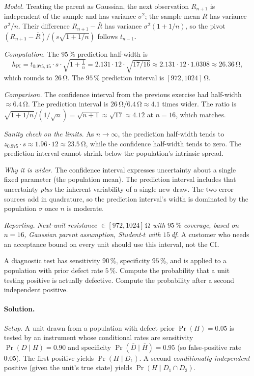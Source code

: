 \textit{Model.} Treating the parent as Gaussian, the next observation
$R_{n+1}$ is independent of the sample and has variance $\sigma^{2}$;
the sample mean $\bar{R}$ has variance $\sigma^{2}/n$. Their
difference $R_{n+1} - \bar{R}$ has variance $\sigma^{2}(1 + 1/n)$,
so the pivot $(R_{n+1} - \bar{R})/(s \sqrt{1 + 1/n})$ follows
$t_{n-1}$.

\textit{Computation.} The $95 \,\%$ prediction half-width is
\[
h_{\text{PI}} = t_{0.975, 15} \cdot s \cdot \sqrt{1 + \tfrac{1}{n}}
= 2.131 \cdot 12 \cdot \sqrt{17/16}
\approx 2.131 \cdot 12 \cdot 1.0308
\approx 26.36 \,\si{\ohm},
\]
which rounds to $26 \,\si{\ohm}$. The $95 \,\%$ prediction interval
is $[972, 1024] \,\si{\ohm}$.

\textit{Comparison.} The confidence interval from the previous
exercise had half-width $\approx 6.4 \,\si{\ohm}$. The prediction
interval is $26 \,\si{\ohm}/6.4 \,\si{\ohm} \approx 4.1$ times
wider. The ratio is $\sqrt{1 + 1/n}/(1/\sqrt{n})
= \sqrt{n + 1} \approx \sqrt{17} \approx 4.12$ at $n = 16$, which
matches.

\textit{Sanity check on the limits.} As $n \to \infty$, the
prediction half-width tends to $z_{0.975} \cdot s \approx
1.96 \cdot 12 \approx 23.5 \,\si{\ohm}$, while the confidence
half-width tends to zero. The prediction interval cannot shrink
below the population's intrinsic spread.

\textit{Why it is wider.} The confidence interval expresses
uncertainty about a single fixed parameter (the population mean).
The prediction interval includes that uncertainty \emph{plus} the
inherent variability of a single new draw. The two error sources
add in quadrature, so the prediction interval's width is dominated
by the population $\sigma$ once $n$ is moderate.

\textit{Reporting.} \emph{Next-unit resistance $\in [972, 1024]
\,\si{\ohm}$ with $95 \,\%$ coverage, based on $n = 16$, Gaussian
parent assumption, Student-$t$ with $15 \,$df.} A customer who
needs an acceptance bound on every unit should use this interval,
not the CI.

\begin{exercise}
A diagnostic test has sensitivity $90 \,\%$, specificity $95 \,\%$,
and is applied to a population with prior defect rate $5 \,\%$.
Compute the probability that a unit testing positive is actually
defective. Compute the probability after a second independent
positive.
\end{exercise}

\paragraph{Solution.}
\textit{Setup.} A unit drawn from a population with defect prior
$\Pr(H) = 0.05$ is tested by an instrument whose conditional rates
are sensitivity $\Pr(D \mid H) = 0.90$ and specificity
$\Pr(\bar{D} \mid \bar{H}) = 0.95$ (so false-positive rate
$0.05$). The first positive yields $\Pr(H \mid D_{1})$. A second
\emph{conditionally independent} positive (given the unit's true
state) yields $\Pr(H \mid D_{1} \cap D_{2})$.

